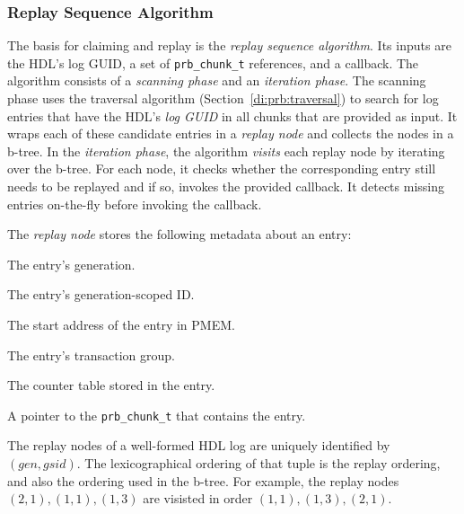 \documentclass[12pt,a4paper,twoside]{book}
\begin{document}
\subsubsection{Replay Sequence Algorithm}
The basis for claiming and replay is the \textit{replay sequence algorithm}.
Its inputs are the HDL's log GUID, a set of \lstinline{prb_chunk_t} references, and a callback.
The algorithm consists of a \textit{scanning phase} and an \textit{iteration phase}.
The scanning phase uses the traversal algorithm (Section~\ref{di:prb:traversal}) to search for log entries that have the HDL's \textit{log GUID} in all chunks that are provided as input.
It wraps each of these candidate entries in a \textit{replay node} and collects the nodes in a b-tree.
In the \textit{iteration phase}, the algorithm \textit{visits} each replay node by iterating over the b-tree.
For each node, it checks whether the corresponding entry still needs to be replayed and if so, invokes the provided callback.
It detects missing entries on-the-fly before invoking the callback.

The \textit{replay node} stores the following metadata about an entry:
\begin{description}[noitemsep,leftmargin=1.5cm,labelindent=1cm]
    \item[Generation (gen)] The entry's generation.
    \item[Generation-Scoped ID (gsid)] The entry's generation-scoped ID.
    \item[PMEM Address] The start address of the entry in PMEM.
    \item[Transaction Group (txg)] The entry's transaction group.
    \item[Counter Table] The counter table stored in the entry.
    \item[Pointer To Chunk (chunk\_ref)] A pointer to the \lstinline{prb_chunk_t} that contains the entry.
\end{description}
The replay nodes of a well-formed HDL log are uniquely identified by $(gen, gsid)$.
The lexicographical ordering of that tuple is the replay ordering, and also the ordering used in the b-tree.
For example, the replay nodes $(2,1), (1,1), (1,3)$ are visisted in order $(1,1), (1,3), (2,1)$.
\end{document}
